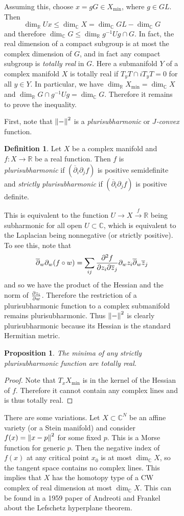 \documentclass[leqno, openany]{memoir}
\newtheorem{prop}[thm]{Proposition}
\theoremstyle{definition}
\newtheorem{defn}[thm]{Definition}
\theoremstyle{remark}
\theoremstyle{plain}
\theoremstyle{definition}
\theoremstyle{remark}
\newcommand{\R}{\mathbb{R}}
\newcommand{\C}{\mathbb{C}}
\newcommand{\ol}[1]{\overline{#1}}
\begin{document}
\begin{figure}[H]
\begin{figure}[H]
Assuming this, choose $x = gG \in X_{\min}$, where $g \in GL$. Then \[
\dim_{\R} U x \leq \dim_{\C} X = \dim_{\C} GL - \dim_{\C} G \] and therefore
$\dim_{\C} G \leq \dim_{\R} g^{-1} U g \cap G$. In fact, the real dimension of
a compact subgroup is at most the complex dimension of $G$, and in fact any
compact subgroup is \textit{totally real} in $G$. Here a submanifold $Y$ of a
complex manifold $X$ is totally real if $T_y T \cap i T_y T = 0$ for all $y \in
Y$. In particular, we have $\dim_{\R} X_{\min} = \dim_{\C} X$ and $\dim_{\R} G
\cap g^{-1} U g = \dim_{\C} G$. Therefore it remains to prove the inequality.

First, note that $\norm{-}^2$ is a \textit{plurisubharmonic} or
\textit{$J$-convex} function.

\begin{defn} Let $X$ be a complex manifold and $f \colon X \to \R$ be a real
    function. Then $f$ is \textit{plurisubharmonic} if $( \ol{\partial}_i
    \partial_j f )$ is positive semidefinite and \textit{strictly
    plurisubharmonic} if $(\ol{\partial}_i \partial_j f)$ is positive definite.
\end{defn}

This is equivalent to the function $U \to X \xrightarrow{f} \R$ being
subharmonic for all open $U \subset \C$, which is equivalent to the Laplacian
being nonnegative (or strictly positive). To see this, note that \[
\ol{\partial}_w \partial_w (f \circ w) = \sum_{ij} \pdv[2]{f}{z_i}{\ol{z}_j}
\partial_w z_i \ol{\partial}_w \ol{z}_j \] and so we have the product of the
Hessian and the norm of $\pdv{z_i}{w}$. Therefore the restriction of a
plurisubharmonic function to a complex submanifold remains plurisubharmonic.
Thus $\norm{-}^2$ is clearly plurisubharmonic because its Hessian is the
standard Hermitian metric.

\begin{prop} The minima of any strictly plurisubharmonic function are totally
real.  \end{prop}

\begin{proof} Note that $T_x X_{\min}$ is in the kernel of the Hessian of $f$.
Therefore it cannot contain any complex lines and is thus totally real.
\end{proof}

There are some variations. Let $X \subset \C^N$ be an affine variety (or a
Stein manifold) and consider $f(x) = \norm{x-p}^2$ for some fixed $p$. This is
a Morse function for generic $p$. Then the negative index of $f(x)$ at any
critical point $x_0$ is at most $\dim_{\C} X$, so the tangent space contains no
complex lines. This implies that $X$ has the homotopy type of a CW complex of
real dimension at most $\dim_{\C} X$. This can be found in a 1959 paper of
Andreoti and Frankel about the Lefschetz hyperplane theorem.


\end{figure}
\end{figure}
\end{document}
